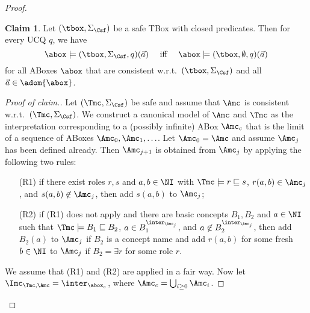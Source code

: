 \documentclass{lmcs}
\theoremstyle{definition}
\newtheorem{claim}{Claim}
\let\OriginalQedSymbol\qedsymbol
\renewcommand{\qedsymbol}{\OriginalQedSymbol\setcounter{claim}{0}}
\let\NormalQedSymbol\qedsymbol
\newenvironment{clmproof}[1]{\renewcommand{\qedsymbol}{$\dashv$}\begin{proof}[Proof of claim.]\space#1}{\end{proof}\renewcommand{\qedsymbol}{\NormalQedSymbol}}
\begin{document}
\begin{proof}
\begin{claim} Let $(\tbox,\Sigma_\Csf)$ be a safe \dlliter TBox with closed
  predicates. Then for every UCQ $q$, we have 
  \[\abox\models 
  (\tbox,\Sigma_\Csf,q)(\vec{a})\quad \text{ iff 
  }  \quad
  \abox\models(\tbox,\emptyset,q)(\vec{a})\]
  for all ABoxes $\abox$ that are consistent w.r.t.\ $(\tbox,\Sigma_\Csf)$ and 
  all $\vec{a}\in\adom{\abox}$.
\end{claim}
\begin{clmproof}
  Let $(\Tmc,\Sigma_\Csf)$ be safe and assume that $\Amc$ is consistent
  w.r.t.~$(\Tmc,\Sigma_\Csf)$. We construct a canonical model of $\Amc$ and $\Tmc$
  as the interpretation corresponding to a (possibly infinite) ABox $\Amc_{c}$ that is the limit
  of a sequence of ABoxes $\Amc_{0},\Amc_{1},\ldots$. Let
  $\Amc_{0}=\Amc$ and assume $\Amc_{j}$ has been defined already. Then $\Amc_{j+1}$ is obtained from $\Amc_{j}$ by applying
  the following two rules:
\begin{itemize}
\item[(R1)] if there exist roles $r,s$ and $a,b\in \NI$ with $\Tmc\models r \sqsubseteq s$, $r(a,b)\in \Amc_{j}$, and $s(a,b)\not\in \Amc_{j}$,
            then add $s(a,b)$ to $\Amc_{j}$;
\item[(R2)] if (R1) does not apply and there are basic concepts $B_{1},B_{2}$ and $a\in \NI$ such that $\Tmc \models B_{1}\sqsubseteq B_{2}$,
      $a\in B_{1}^{\inter_{\Amc_{j}}}$, and $a\not\in B_{2}^{\inter_{\Amc_{j}}}$, then add $B_{2}(a)$ to $\Amc_{j}$ if $B_{2}$ is a concept name
      and add $r(a,b)$ for some fresh $b\in \NI$ to $\Amc_{j}$ if $B_{2}=\exists r$ for some role $r$.
\end{itemize}
We assume that (R1) and (R2) are applied in a fair way. Now let $\Imc_{\Tmc,\Amc}=\inter_{\abox_{c}}$, where $\Amc_{c} = \bigcup_{i\geq 0}\Amc_{i}$.

\end{clmproof}
\end{proof}
\end{document}
